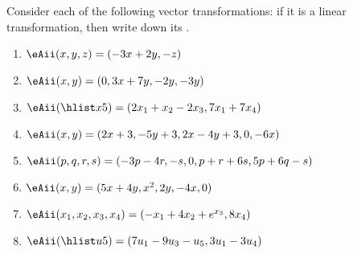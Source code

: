 \begin{exercise} \label{ex:} 
Consider each of the following vector transformations: if it is a linear transformation, then write down its .
\begin{enumerate}
\item \(\eAii(x,y,z)=(-3x+2y,-z)\)

\item \(\eAii(x,y)=(0,3x+7y,-2y,-3y)\)

\item \(\eAii(\hlist x5)=(2x_1+x_2-2x_3,7x_1+7x_4)\)

\item \(\eAii(x,y)=(2x+3,-5y+3,2x-4y+3,0,-6x)\)

\item \(\eAii(p,q,r,s)=(-3p-4r,-s,0,p+r+6s,5p+6q-s)\)

\item \(\eAii(x,y)=(5x+4y,x^2,2y,-4x,0)\)

\item \(\eAii(x_1,x_2,x_3,x_4)=(-x_1+4x_2+e^{x_3},8x_4)\)

\item \(\eAii(\hlist u5)=(7u_1-9u_3-u_5,3u_1-3u_4)\)

\end{enumerate}
\end{exercise}





